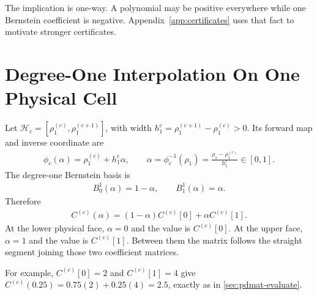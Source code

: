 The implication is one-way.  A polynomial may be positive everywhere while one Bernstein coefficient is negative. Appendix~\ref{app:certificates} uses that fact to motivate stronger certificates.

\section{Degree-One Interpolation On One Physical Cell}

Let $\mathcal H_c=[\rho_1^{(c)},\rho_1^{(c+1)}]$, with width $h_1^{c}=\rho_1^{(c+1)}-\rho_1^{(c)}>0$. Its forward map and inverse coordinate are
\begin{gather*}
  \phi_c(\alpha)=\rho_1^{(c)}+h_1^c\alpha,
  \qquad
  \alpha=\phi_c^{-1}(\rho_1)
  =\frac{\rho_1-\rho_1^{(c)}}{h_1^c}\in[0,1].
\end{gather*}
The degree-one Bernstein basis is
\begin{gather*}
B_0^1(\alpha)=1-\alpha,\qquad B_1^1(\alpha)=\alpha.
\end{gather*}
Therefore
\begin{gather*}
C^{(c)}(\alpha)=(1-\alpha)C^{(c)}[0]+\alpha C^{(c)}[1].
\end{gather*}
At the lower physical face, $\alpha=0$ and the value is $C^{(c)}[0]$. At the upper face, $\alpha=1$ and the value is $C^{(c)}[1]$.  Between them the matrix follows the straight segment joining those two coefficient matrices.

For example, $C^{(c)}[0]=2$ and $C^{(c)}[1]=4$ give $C^{(c)}(0.25)=0.75(2)+0.25(4)=2.5$, exactly as in \cref{sec:pdmat-evaluate}.
\begin{center}
\end{center}

